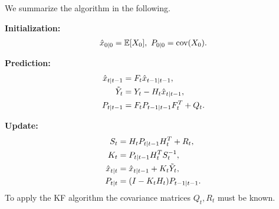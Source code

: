 



We summarize the algorithm in the following.

\textbf{Initialization:}
\begin{align}
  \label{eq:Kalman_init}
  \hat x_{0|0} = \mathbb{E}[{X_0}], \ P_{0|0} = \mbox{cov}(X_0).
\end{align}

\textbf{Prediction:}
\begin{align}
  \label{eq:Kalman_prediction}
  \hat{x}_{t|t-1} &= F_t \hat{x}_{t-1|t-1} ,\\
  {\tilde{Y}}_t &= Y_t - H_t \hat{x}_{t|t-1} ,\\
  P_{t|t-1} &= F_t P_{t-1|t-1} F_t^T + Q_t .
\end{align}

\textbf{Update:}
\begin{align}
  \label{eq:Kalman_update}
  S_t &= H_t P_{t|t-1} H_t^T + R_t ,\\
  K_t &= P_{t|t-1}H_t^T S_t^{-1} ,\\
  \hat{x}_{t|t} &= \hat{x}_{t|t-1} + K_t {\tilde{Y}}_t , \\
  P_{t|t} &= (I - K_tH_t) P_{t-1|t-1} .
\end{align}
To apply the KF algorithm the covariance matrices $Q_t, R_t$ must
be known.

